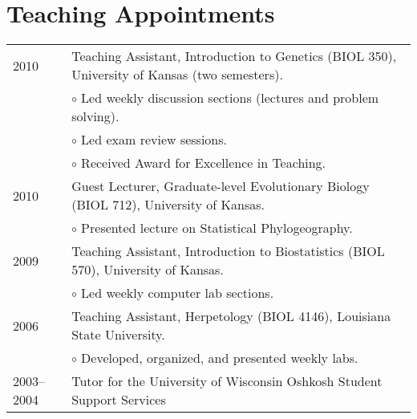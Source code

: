\documentclass[10pt]{article}
\renewcommand{\labelitemi}{$\circ$}
\newcommand{\tableSubItem}{\addtolength{\leftskip}{1em} \labelitemi \xspace}
\begin{document}
\section*{Teaching Appointments}
\noindent\begin{tabulary}{\textwidth}{ @{} l L @{} }
2010    & Teaching Assistant, Introduction to Genetics (BIOL 350),
              University of Kansas (two semesters). \\
        & \tableSubItem Led weekly discussion sections (lectures and problem
              solving). \\
        & \tableSubItem Led exam review sessions. \\
        & \tableSubItem Received Award for Excellence in Teaching. \\[0.25em]
2010    & Guest Lecturer, Graduate-level Evolutionary Biology (BIOL 712),
              University of Kansas. \\
        & \tableSubItem Presented lecture on Statistical Phylogeography.
              \\[0.25em]
2009    & Teaching Assistant, Introduction to Biostatistics (BIOL 570),
              University of Kansas. \\
        & \tableSubItem Led weekly computer lab sections. \\[0.25em]
2006    & Teaching Assistant, Herpetology (BIOL 4146), Louisiana State
              University. \\
        & \tableSubItem Developed, organized, and presented weekly labs.
              \\[0.25em]
2003--2004 & Tutor for the University of Wisconsin Oshkosh Student Support
              Services \\
\end{tabulary}
\end{document}
